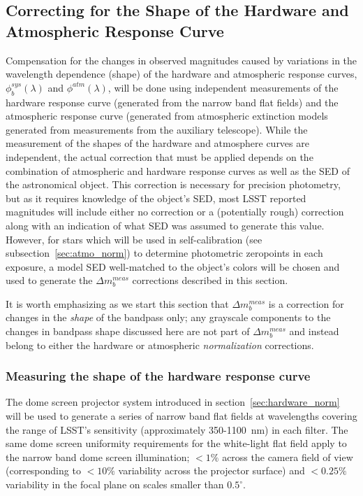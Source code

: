 \documentclass[12pt,preprint]{aastex}
\begin{document}

\subsection{Correcting for the Shape of the Hardware and Atmospheric
  Response Curve}
\label{sec:phi_correction}

Compensation for the changes in observed magnitudes caused by
variations in the wavelength dependence (shape) of the hardware and
atmospheric response curves, $\phi_b^{sys}(\lambda)$ and
$\phi^{atm}(\lambda)$, will be done using independent measurements of
the hardware response curve (generated from the narrow band flat fields) and the
atmospheric response curve (generated from atmospheric extinction models
generated from measurements from the auxiliary telescope).  While the
measurement of the shapes of the hardware and atmosphere curves are
independent, the actual correction that must be applied depends on the
combination of atmospheric and hardware response curves as well as the
SED of the astronomical object.  This correction is necessary for
precision photometry, but as it requires knowledge of the object's
SED, most LSST reported magnitudes will include either no correction
or a (potentially rough) correction along with an indication of what
SED was assumed to generate this value. However, for stars which will
be used in self-calibration (see subsection~\ref{sec:atmo_norm}) to
determine photometric zeropoints in each exposure, a model SED
well-matched to the object's colors will be chosen and used to
generate the $\Delta m_b^{meas}$ corrections described in this
section.

It is worth emphasizing as we start this section that $\Delta
m_b^{meas}$ is a correction for changes in the {\it shape} of the
bandpass only; any grayscale components to the changes in bandpass
shape discussed here are not part of $\Delta m_b^{meas}$ and instead
belong to either the hardware or atmospheric {\it normalization}
corrections.

\subsubsection{Measuring the shape of the hardware response curve}
\label{sec:hardware_phi}

The dome screen projector system introduced in
section~\ref{sec:hardware_norm} will be used to generate a series of
narrow band flat fields at wavelengths covering the range of LSST's
sensitivity (approximately 350-1100~nm) in each filter.  The same dome
screen uniformity requirements for the white-light flat field apply to
the narrow band dome screen illumination; $<1\%$ across the camera
field of view (corresponding to $<10\%$ variability across the
projector surface) and $<0.25\%$ variability in the focal plane on
scales smaller than $0.5^{\circ}$.
\end{document}

